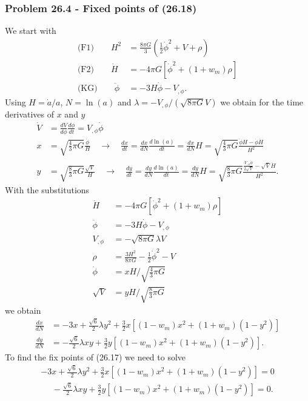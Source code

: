 \documentclass[10pt,a4paper]{article}
\theoremstyle{definition}
\begin{document}
\subsubsection{Problem 26.4 - Fixed points of (26.18)}
We start with
\begin{align}
    \text{(F1)}\qquad H^2&=\frac{8\pi G}{3}\left(\frac{1}{2}\dot{\phi}^2+V+\rho\right)\\
    \text{(F2)}\qquad \dot{H}&=-4\pi G\left[\dot{\phi}^2+(1+w_m)\rho\right]\\
    \text{(KG)}\qquad \ddot{\phi}&=-3H\dot{\phi}-V_{,\phi}.
\end{align}
Using $H=\dot{a}/a$, $N=\ln(a)$ and $\lambda=-V_{,\phi}/(\sqrt{8\pi G}V)$ we obtain for the time derivatives of $x$ and $y$
\begin{align}
    \dot{V}&=\frac{dV}{d\phi}\frac{d\phi}{dt}=V_{,\phi}\dot{\phi}\\
    x&=\sqrt{\frac{4}{3}\pi G}\frac{\dot{\phi}}{H}\quad\rightarrow\quad\frac{dx}{dt}=\frac{dx}{dN}\frac{d\ln(a)}{dt}
    =\frac{dx}{dN}H
    =\sqrt{\frac{4}{3}\pi G}\frac{\ddot{\phi}H-\dot{\phi}\dot{H}}{H^2}\\
    y&=\sqrt{\frac{8}{3}\pi G}\frac{\sqrt{V}}{H}\quad\rightarrow\quad\frac{dy}{dt}=\frac{dy}{dN}\frac{d\ln(a)}{dt}
    =\frac{dy}{dN}H
    =\sqrt{\frac{8}{3}\pi G}\frac{\frac{V_{,\phi}\dot{\phi}}{2\sqrt{V}}-\sqrt{V}\dot{H}}{H^2}.
\end{align}
With the substitutions
\begin{align}
    \dot{H}&=-4\pi G\left[\dot{\phi}^2+(1+w_m)\rho\right]\\
    \ddot{\phi}&=-3H\dot{\phi}-V_{,\phi}\\
    V_{,\phi}&=-\sqrt{8\pi G}\lambda V\\
    \rho&=\frac{3H^2}{8\pi G}-\frac{1}{2}\dot{\phi}^2-V\\
    \dot{\phi}&=xH/\sqrt{\frac{4}{3}\pi G}\\
    \sqrt{V}&=yH/\sqrt{\frac{8}{3}\pi G}
\end{align}
we obtain
\begin{align}
    \frac{dx}{dN}
    &=-3x+\frac{\sqrt{6}}{2}\lambda y^2+\frac{3}{2}x[(1-w_m)x^2+(1+w_m)(1-y^2)]\\
    \frac{dy}{dN}
    &=-\frac{\sqrt{6}}{2}\lambda xy+\frac{3}{2}y[(1-w_m)x^2+(1+w_m)(1-y^2)].
\end{align}
To find the fix points of (26.17) we need to solve
\begin{align}
    -3x+\frac{\sqrt{6}}{2}\lambda y^2+\frac{3}{2}x[(1-w_m)x^2+(1+w_m)(1-y^2)]=0\\
    \quad\,\,-\frac{\sqrt{6}}{2}\lambda xy+\frac{3}{2}y[(1-w_m)x^2+(1+w_m)(1-y^2)]=0.
\end{align}
\end{document}
